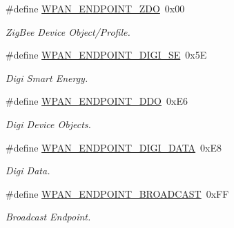 \begin{DoxyCompactItemize}
\item 
\hypertarget{group__wpan__aps_ga860a08927c4e6d7656281713186c43dd}{\#define \hyperlink{group__wpan__aps_ga860a08927c4e6d7656281713186c43dd}{W\-P\-A\-N\-\_\-\-E\-N\-D\-P\-O\-I\-N\-T\-\_\-\-Z\-D\-O}~0x00}\label{group__wpan__aps_ga860a08927c4e6d7656281713186c43dd}

\begin{DoxyCompactList}\small\item\em Zig\-Bee Device Object/\-Profile. \end{DoxyCompactList}\item 
\hypertarget{group__wpan__aps_ga0c664cef1ec55fd759b5ec9d4bea2618}{\#define \hyperlink{group__wpan__aps_ga0c664cef1ec55fd759b5ec9d4bea2618}{W\-P\-A\-N\-\_\-\-E\-N\-D\-P\-O\-I\-N\-T\-\_\-\-D\-I\-G\-I\-\_\-\-S\-E}~0x5\-E}\label{group__wpan__aps_ga0c664cef1ec55fd759b5ec9d4bea2618}

\begin{DoxyCompactList}\small\item\em Digi Smart Energy. \end{DoxyCompactList}\item 
\hypertarget{group__wpan__aps_ga97ce39dc7f8bc63ac9d874b1c807158d}{\#define \hyperlink{group__wpan__aps_ga97ce39dc7f8bc63ac9d874b1c807158d}{W\-P\-A\-N\-\_\-\-E\-N\-D\-P\-O\-I\-N\-T\-\_\-\-D\-D\-O}~0x\-E6}\label{group__wpan__aps_ga97ce39dc7f8bc63ac9d874b1c807158d}

\begin{DoxyCompactList}\small\item\em Digi Device Objects. \end{DoxyCompactList}\item 
\hypertarget{group__wpan__aps_ga83cb85a2a1e374554f9ad735c9c06e7b}{\#define \hyperlink{group__wpan__aps_ga83cb85a2a1e374554f9ad735c9c06e7b}{W\-P\-A\-N\-\_\-\-E\-N\-D\-P\-O\-I\-N\-T\-\_\-\-D\-I\-G\-I\-\_\-\-D\-A\-T\-A}~0x\-E8}\label{group__wpan__aps_ga83cb85a2a1e374554f9ad735c9c06e7b}

\begin{DoxyCompactList}\small\item\em Digi Data. \end{DoxyCompactList}\item 
\hypertarget{group__wpan__aps_ga1a2c2bd5eb7dcb276d89e7f7e9d66d32}{\#define \hyperlink{group__wpan__aps_ga1a2c2bd5eb7dcb276d89e7f7e9d66d32}{W\-P\-A\-N\-\_\-\-E\-N\-D\-P\-O\-I\-N\-T\-\_\-\-B\-R\-O\-A\-D\-C\-A\-S\-T}~0x\-F\-F}\label{group__wpan__aps_ga1a2c2bd5eb7dcb276d89e7f7e9d66d32}

\begin{DoxyCompactList}\small\item\em Broadcast Endpoint. \end{DoxyCompactList}\end{DoxyCompactItemize}

